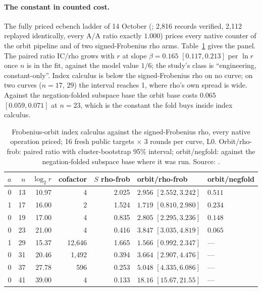 \paragraph{The constant in counted cost.} The fully priced ecbench ladder of
14 October (;
2{,}816 records verified, 2{,}112 replayed identically, every A/A ratio
exactly $1.000$) prices every native counter of the orbit pipeline and of
two signed-Frobenius rho arms. Table~\ref{tab:kc-orbit} gives the panel. The
paired ratio IC/rho grows with $r$ at slope $\beta=0.165$ $[0.117,0.213]$
per $\ln r$ once $n$ is in the fit, against the model value $1/6$; the
study's class is ``engineering, constant-only''. Index calculus is below the
signed-Frobenius rho on no curve; on two curves ($n=17$, $29$) the interval
reaches 1, where rho's own spread is wide. Against the negation-folded
subspace base the orbit base costs $0.065$ $[0.059,0.071]$ at $n=23$, which
is the constant the fold buys inside index calculus.

\begin{table}[t]
\centering\small
\begin{tabular}{@{}rrrrrll@{}}
\toprule
$a$ & $n$ & $\log_2r$ & cofactor & $S$ rho-frob & orbit/rho-frob & orbit/negfold \\
\midrule
0 & 13 & 10.97 & 4 & 2.025 & $2.956$ $[2.552,3.242]$ & $0.511$ \\
1 & 17 & 16.00 & 2 & 1.524 & $1.719$ $[0.810,2.980]$ & $0.234$ \\
0 & 19 & 17.00 & 4 & 0.835 & $2.805$ $[2.295,3.236]$ & $0.148$ \\
0 & 23 & 21.00 & 4 & 0.416 & $3.847$ $[3.035,4.819]$ & $0.065$ \\
1 & 29 & 15.37 & 12{,}646 & 1.665 & $1.566$ $[0.992,2.347]$ & --- \\
0 & 31 & 20.46 & 1{,}492 & 0.394 & $3.664$ $[2.907,4.476]$ & --- \\
0 & 37 & 27.78 & 596 & 0.253 & $5.048$ $[4.335,6.086]$ & --- \\
0 & 41 & 39.00 & 4 & 0.133 & $18.16$ $[15.67,21.55]$ & --- \\
\bottomrule
\end{tabular}
\caption[]{Frobenius-orbit index calculus against the signed-Frobenius rho,
every native operation priced; 16 fresh public targets $\times$ 3 rounds
per curve, L0. Orbit/rho-frob: paired ratio with cluster-bootstrap 95\%
interval; orbit/negfold: against the negation-folded subspace base where it
was run. Source:
.}
\label{tab:kc-orbit}
\end{table}

